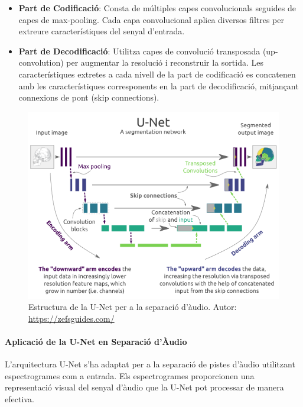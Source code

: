 \documentclass[10pt,a4paper,twocolumn,twoside]{article}
\begin{document}
\begin{itemize}
    \item \textbf{Part de Codificació}: Consta de múltiples capes convolucionals seguides de capes de max-pooling. Cada capa convolucional aplica diversos filtres per extreure característiques del senyal d'entrada.
    \item \textbf{Part de Decodificació}: Utilitza capes de convolució transposada (up-convolution) per augmentar la resolució i reconstruir la sortida. Les característiques extretes a cada nivell de la part de codificació es concatenen amb les característiques corresponents en la part de decodificació, mitjançant connexions de pont (skip connections).
\end{itemize}

\begin{figure}[h]
    \centering
    \includegraphics[width=1\linewidth]{img/unet_arquitectura.png}
    \caption{Estructura de la U-Net per a la separació d'àudio. Autor: \href{https://zefsguides.com/}{https://zefsguides.com/}}
    \label{fig:arquitectura-u-net}
\end{figure}

\paragraph{Aplicació de la U-Net en Separació d'Àudio}
L'arquitectura U-Net s'ha adaptat per a la separació de pistes d'àudio utilitzant espectrogrames com a entrada. Els espectrogrames proporcionen una representació visual del senyal d'àudio que la U-Net pot processar de manera efectiva.
\end{document}
